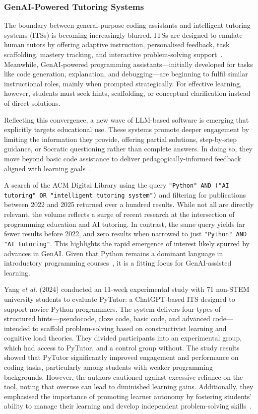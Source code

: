\subsubsection{GenAI-Powered Tutoring Systems}

The boundary between general-purpose coding assistants and intelligent tutoring systems (ITSs) is becoming increasingly blurred. ITSs are designed to emulate human tutors by offering adaptive instruction, personalised feedback, task scaffolding, mastery tracking, and interactive problem-solving support~\cite{crow_intelligent_2018}. Meanwhile, GenAI-powered programming assistants---initially developed for tasks like code generation, explanation, and debugging---are beginning to fulfil similar instructional roles, mainly when prompted strategically. For effective learning, however, students must seek hints, scaffolding, or conceptual clarification instead of direct solutions. 

Reflecting this convergence, a new wave of LLM-based software is emerging that explicitly targets educational use. These systems promote deeper engagement by limiting the information they provide, offering partial solutions, step-by-step guidance, or Socratic questioning rather than complete answers. In doing so, they move beyond basic code assistance to deliver pedagogically-informed feedback aligned with learning goals~\cite{chen_gptutor_2023}.

A search of the ACM Digital Library using the query \texttt{"Python" AND ("AI tutoring" OR "intelligent tutoring system")} and filtering for publications between 2022 and 2025 returned over a hundred results. While not all are directly relevant, the volume reflects a surge of recent research at the intersection of programming education and AI tutoring. In contrast, the same query yields far fewer results before 2022, and zero results when narrowed to just \texttt{"Python" AND "AI tutoring"}. This highlights the rapid emergence of interest likely spurred by advances in GenAI. Given that Python remains a dominant language in introductory programming courses~\cite{guo_python_2014}, it is a fitting focus for GenAI-assisted learning.

Yang \textit{et al.} (2024) conducted an 11-week experimental study with 71 non-STEM university students to evaluate PyTutor: a ChatGPT-based ITS designed to support novice Python programmers. The system delivers four types of structured hints---pseudocode, cloze code, basic code, and advanced code---intended to scaffold problem-solving based on constructivist learning and cognitive load theories. They divided participants into an experimental group, which had access to PyTutor, and a control group without. The study results showed that PyTutor significantly improved engagement and performance on coding tasks, particularly among students with weaker programming backgrounds. However, the authors cautioned against excessive reliance on the tool, noting that overuse can lead to diminished learning gains. Additionally, they emphasised the importance of promoting learner autonomy by fostering students' ability to manage their learning and develop independent problem-solving skills~\cite{yang_advancing_2024}.

